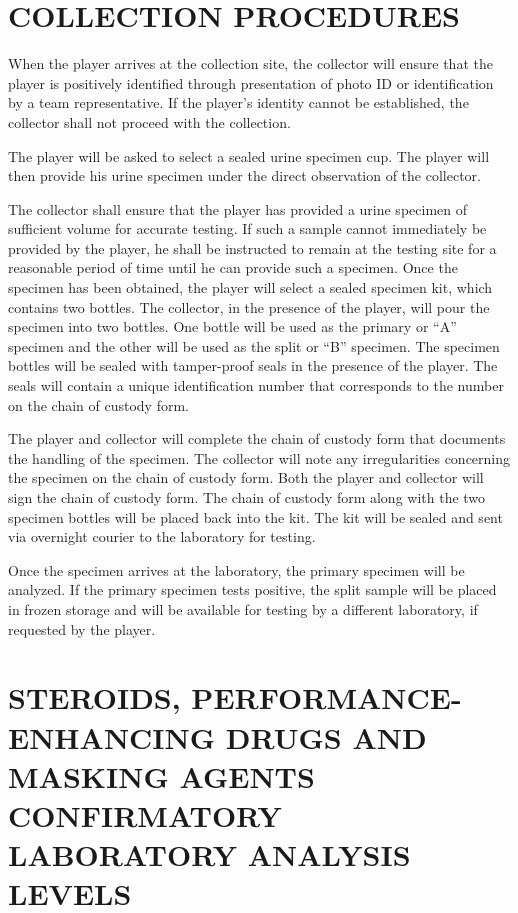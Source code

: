 \documentclass[
]{book}
\begin{document}
\hypertarget{collection-procedures}{%
\section{COLLECTION PROCEDURES}\label{collection-procedures}}

When the player arrives at the collection site, the collector will ensure that the player is positively identified through presentation of photo ID or identification by a team representative. If the player's identity cannot be established, the collector shall not proceed with the collection.

The player will be asked to select a sealed urine specimen cup. The player will then provide his urine specimen under the direct observation of the collector.

The collector shall ensure that the player has provided a urine specimen of sufficient volume for accurate testing. If such a sample cannot immediately be provided by the player, he shall be instructed to remain at the testing site for a reasonable period of time until he can provide such a specimen. Once the specimen has been obtained, the player will select a sealed specimen kit, which contains two bottles. The collector, in the presence of the player, will pour the specimen into two bottles. One bottle will be used as the primary or ``A'' specimen and the other will be used as the split or ``B'' specimen. The specimen bottles will be sealed with tamper-proof seals in the presence of the player. The seals will contain a unique identification number that corresponds to the number on the chain of custody form.

The player and collector will complete the chain of custody form that documents the handling of the specimen. The collector will note any irregularities concerning the specimen on the chain of custody form. Both the player and collector will sign the chain of custody form. The chain of custody form along with the two specimen bottles will be placed back into the kit. The kit will be sealed and sent via overnight courier to the laboratory for testing.

Once the specimen arrives at the laboratory, the primary specimen will be analyzed. If the primary specimen tests positive, the split sample will be placed in frozen storage and will be available for testing by a different laboratory, if requested by the player.

\hypertarget{steroids-performance-enhancing-drugs-and-masking-agents-confirmatory-laboratory-analysis-levels}{%
\section{STEROIDS, PERFORMANCE-ENHANCING DRUGS AND MASKING AGENTS CONFIRMATORY LABORATORY ANALYSIS LEVELS}\label{steroids-performance-enhancing-drugs-and-masking-agents-confirmatory-laboratory-analysis-levels}}
\end{document}
